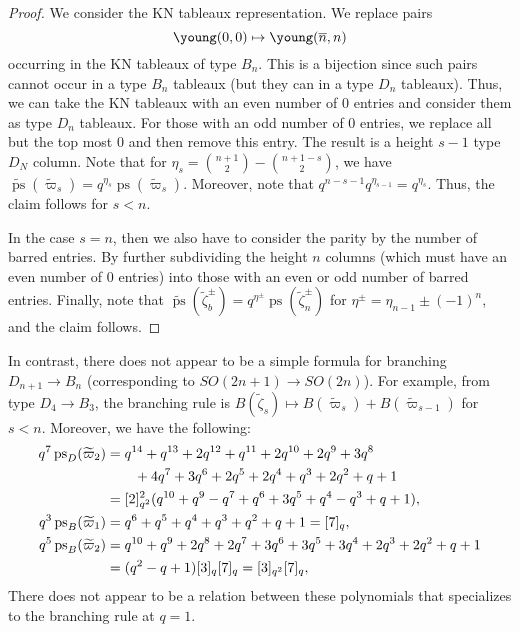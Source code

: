\documentclass[11pt, leqno]{amsart}
\theoremstyle{plain}
\theoremstyle{definition}
\numberwithin{equation}{section}
\newcommand{\fw}{\varpi} %
\newcommand{\tfw}{\widetilde{\fw}} %
\newcommand{\ps}{\operatorname{ps}} %
\newcommand{\nps}{\widetilde{\ps}} %
\newcommand{\on}{\overline{n}}
\begin{document}
\begin{proof}
We consider the KN tableaux representation. We replace pairs
\[
\young(0,0) \mapsto \young(\on,n)
\]
occurring in the KN tableaux of type $B_n$. This is a bijection since such pairs cannot occur in a type $B_n$ tableaux (but they can in a type $D_n$ tableaux). Thus, we can take the KN tableaux with an even number of $0$ entries and consider them as type $D_n$ tableaux. For those with an odd number of $0$ entries, we replace all but the top most $0$ and then remove this entry. The result is a height $s-1$ type $D_N$ column.
Note that for $\eta_s = \binom{n+1}{2} - \binom{n+1-s}{2}$, we have $\nps(\tfw_s) = q^{\eta_s} \ps(\tfw_s)$.
Moreover, note that $q^{n-s-1} q^{\eta_{s-1}} = q^{\eta_s}$. Thus, the claim follows for $s < n$.

In the case $s = n$, then we also have to consider the parity by the number of barred entries. By further subdividing the height $n$ columns (which must have an even number of $0$ entries) into those with an even or odd number of barred entries. Finally, note that $\nps(\widetilde{\zeta}_b^{\pm}) = q^{\eta^{\pm}} \ps(\widetilde{\zeta}_n^{\pm})$ for $\eta^{\pm} = \eta_{n-1} \pm (-1)^n$, and the claim follows.
\end{proof}

In contrast, there does not appear to be a simple formula for branching $D_{n+1} \to B_n$ (corresponding to $SO(2n+1) \to SO(2n)$). For example, from type $D_4 \to B_3$, the branching rule is $B(\widetilde{\zeta}_s) \mapsto B(\tfw_s) + B(\tfw_{s-1})$ for $s < n$. Moreover, we have the following:
\begin{align*}
q^7 \ps_D(\tfw_2) & = q^{14} + q^{13} + 2 q^{12} + q^{11} + 2 q^{10} + 2 q^9 + 3 q^8
\\ & \hspace{20pt} + 4 q^7 + 3 q^6 + 2 q^5 + 2 q^4 + q^3 + 2 q^2 + q + 1
 \allowdisplaybreaks  \\ & = [2]_{q^2}^2 (q^{10} + q^9 - q^7 + q^6 + 3 q^5 + q^4 - q^3 + q + 1),
\allowdisplaybreaks  \\ q^3 \ps_B(\tfw_1) & = q^6 + q^5 + q^4 + q^3 + q^2 + q + 1 = [7]_q,
\allowdisplaybreaks  \\ q^5 \ps_B(\tfw_2) & = q^{10} + q^9 + 2 q^8 + 2 q^7 + 3 q^6 + 3 q^5 + 3 q^4 + 2 q^3 + 2 q^2 + q + 1
 \allowdisplaybreaks  \\ & = (q^2 - q + 1) [3]_q [7]_q = [3]_{q^2} [7]_q,
\end{align*}
There does not appear to be a relation between these polynomials that specializes to the branching rule at $q = 1$.
\end{document}
